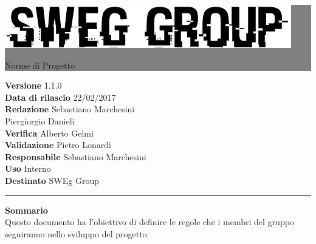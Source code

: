 \documentclass[12pt,a4paper,titlepage]{article}
\newcommand{\HRule}[1]{\hfill \rule{0.2\linewidth}{#1}} %
\begin{document}
	
	\thispagestyle{empty} %
	
	
	\colorbox{grey}{
		\parbox[t]{1.0\linewidth}{
			\centering \fontsize{50pt}{80pt}\selectfont %
			\vspace*{0.7cm} %
			
			\raggedleft
			\includegraphics[width=0.7\linewidth]{LogoSWEgGroupSFONDOVUOTO.png}
			
			\hfill Norme di Progetto \\
			
			\vspace*{0.7cm} %
		}
	}
	
	
	\vfill %
	
	
	{\centering \large 
		\hfill \textbf{Versione} 1.1.0 \\
		\hfill \textbf{Data di rilascio} 22/02/2017 \\
		\hfill \textbf{Redazione} Sebastiano Marchesini \\
		\hfill Piergiorgio Danieli \\
		\hfill \textbf{Verifica} Alberto Gelmi \\
		\hfill \textbf{Validazione} Pietro Lonardi \\
		\hfill \textbf{Responsabile} Sebastiano Marchesini \\
		\hfill \textbf{Uso} Interno \\
		\hfill \textbf{Destinato} SWEg Group \\ 
		
		\HRule{1pt}
		
		\textbf{Sommario} \\
		Questo documento ha l'obiettivo di definire le regole che i membri del gruppo seguiranno nello sviluppo del progetto.
		
	} %
	
\end{document}
